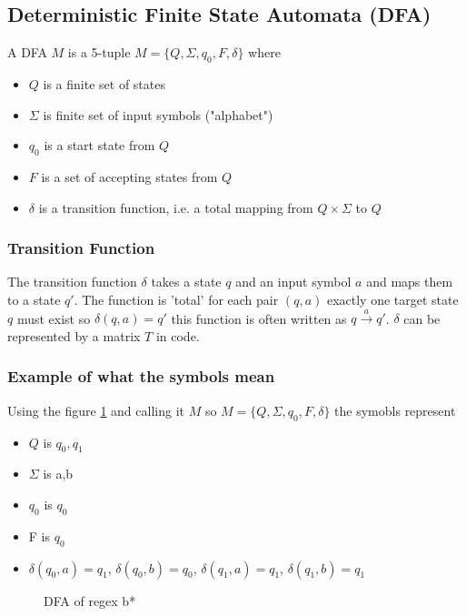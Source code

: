 \subsection{Deterministic Finite State Automata (DFA)}
A DFA $M$ is  a 5-tuple $M= \{Q,\Sigma,q_0,F,\delta\}$ where 
\begin{itemize}
    \item $Q$ is a finite set of states
    \item $\Sigma$ is finite set of input symbols ("alphabet")
    \item $q_0$ is a start state from $Q$
    \item $F$ is a set of accepting states from $Q$
    \item $\delta$ is a transition function, i.e. a total mapping from $Q\times\Sigma$ to $Q$
\end{itemize}
\subsubsection{Transition Function}
The transition function $\delta$ takes a state $q$ and an input symbol $a$ and maps them to a state $q'$. The function is 'total' for each pair $(q,a)$ exactly one target state $q$ must exist so $\delta(q,a)=q'$ this function is often written as $q \xrightarrow{a}q'$. $\delta$ can be represented by a matrix $T$ in code.
\subsubsection{Example of what the symbols mean}
Using the figure \ref{fig:DFAB*} and calling it $M$ so $M= \{Q,\Sigma,q_0,F,\delta\}$ the symobls represent
\begin{itemize}
    \item $Q$ is $q_0,q_1$
    \item $\Sigma$ is a,b
    \item $q_0$ is $q_0$
    \item F is $q_0$
    \item $\delta(q_0,a) = q_1$, $\delta(q_0,b) = q_0$, $\delta(q_1,a) = q_1$, $\delta(q_1,b) = q_1$
\end{itemize}
\begin{figure}[H]
    \centering
    \caption{DFA of regex b*}
    \label{fig:DFAB*}
\end{figure}
